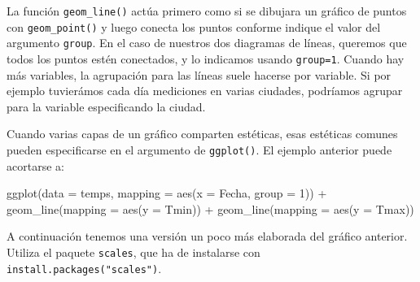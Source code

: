 \documentclass[
  degree=mecinf,
  title=normal,
  toc=normal,
  bib=normal]{mnye}
\newenvironment{Shaded}{\begin{snugshade}}{\end{snugshade}}
\newcommand{\AttributeTok}[1]{\textcolor[rgb]{0.77,0.63,0.00}{#1}}
\newcommand{\DecValTok}[1]{\textcolor[rgb]{0.00,0.00,0.81}{#1}}
\newcommand{\FunctionTok}[1]{\textcolor[rgb]{0.00,0.00,0.00}{#1}}
\newcommand{\NormalTok}[1]{#1}
\newcommand{\SpecialCharTok}[1]{\textcolor[rgb]{0.00,0.00,0.00}{#1}}
\begin{document}
La función \texttt{geom\_line()} actúa primero como si se dibujara un gráfico de puntos con \texttt{geom\_point()} y luego conecta los puntos conforme indique el valor del argumento \texttt{group}. En el caso de nuestros dos diagramas de líneas, queremos que todos los puntos estén conectados, y lo indicamos usando \texttt{group=1}. Cuando hay más variables, la agrupación para las líneas suele hacerse por variable. Si por ejemplo tuvierámos cada día mediciones en varias ciudades, podríamos agrupar para la variable especificando la ciudad.

Cuando varias capas de un gráfico comparten estéticas, esas estéticas comunes pueden especificarse en el argumento de \texttt{ggplot()}. El ejemplo anterior puede acortarse a:

\begin{Shaded}
\begin{Highlighting}[]
\FunctionTok{ggplot}\NormalTok{(}\AttributeTok{data =}\NormalTok{ temps, }\AttributeTok{mapping =} \FunctionTok{aes}\NormalTok{(}\AttributeTok{x =}\NormalTok{ Fecha, }\AttributeTok{group  =} \DecValTok{1}\NormalTok{)) }\SpecialCharTok{+} 
    \FunctionTok{geom\_line}\NormalTok{(}\AttributeTok{mapping =} \FunctionTok{aes}\NormalTok{(}\AttributeTok{y =}\NormalTok{ Tmin)) }\SpecialCharTok{+} 
    \FunctionTok{geom\_line}\NormalTok{(}\AttributeTok{mapping =} \FunctionTok{aes}\NormalTok{(}\AttributeTok{y =}\NormalTok{ Tmax)) }
\end{Highlighting}
\end{Shaded}

A continuación tenemos una versión un poco más elaborada del gráfico anterior. Utiliza el paquete \texttt{scales}, que ha de instalarse con \texttt{install.packages("scales")}.
\end{document}
